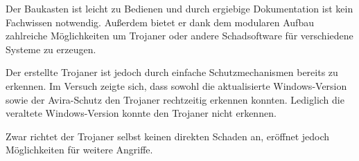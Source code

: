 Der Baukasten ist leicht zu Bedienen und durch ergiebige Dokumentation ist kein Fachwissen notwendig.
Außerdem bietet er dank dem modularen Aufbau zahlreiche Möglichkeiten um Trojaner oder andere Schadsoftware für verschiedene Systeme zu erzeugen.

Der erstellte Trojaner ist jedoch durch einfache Schutzmechanismen bereits zu erkennen.
Im Versuch zeigte sich, dass sowohl die aktualisierte Windows-Version sowie der Avira-Schutz den Trojaner rechtzeitig erkennen konnten.
Lediglich die veraltete Windows-Version konnte den Trojaner nicht erkennen. 

Zwar richtet der Trojaner selbst keinen direkten Schaden an, eröffnet jedoch Möglichkeiten für weitere Angriffe.

